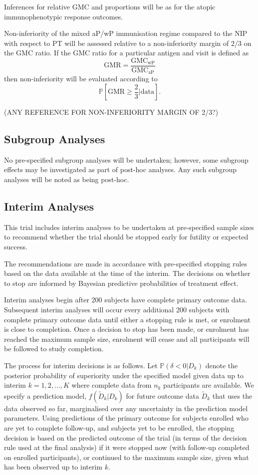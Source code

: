 \documentclass{bmcart}
\begin{document}
Inferences for relative GMC and proportions will be as for the atopic immunophenotypic response outcomes.

Non-inferiority of the mixed aP/wP immunisation regime compared to the NIP with respect to PT will be assessed relative to a non-inferiority margin of 2/3 on the GMC ratio.
If the GMC ratio for a particular antigen and visit is defined as
$$
\text{GMR} = \frac{\text{GMC}_\text{wP}}{\text{GMC}_\text{aP}}
$$ 
then non-inferiority will be evaluated according to
$$
\mathbb P\left[\text{GMR}\geq \frac{2}{3}\Big\vert \text{data}\right].
$$

(ANY REFERENCE FOR NON-INFERIORITY MARGIN OF 2/3?)

\subsection*{Subgroup Analyses}

No pre-specified subgroup analyses will be undertaken; however, some subgroup effects may be investigated as part of post-hoc analyses.
Any such subgroup analyses will be noted as being post-hoc.

\subsection*{Interim Analyses}

This trial includes interim analyses to be undertaken at pre-specified sample sizes to recommend whether the trial should be stopped early for futility or expected success.

The recommendations are made in accordance with pre-specified stopping rules based on the data available at the time of the interim.
The decisions on whether to stop are informed by Bayesian predictive probabilities of treatment effect.

Interim analyses begin after 200 subjects have complete primary outcome data.
Subsequent interim analyses will occur every additional 200 subjects with complete primary outcome data until either a stopping rule is met, or enrolment is close to completion.
Once a decision to stop has been made, or enrolment has reached the maximum sample size, enrolment will cease and all participants will be followed to study completion.

The process for interim decisions is as follows.
Let $\mathbb P(\delta < 0|D_k)$ denote the posterior probability of superiority under the specified model given data up to interim $k=1,2,...,K$ where complete data from $n_k$ participants are available.
We specify a prediction model, $f(\tilde D_k|D_k)$ for future outcome data $\tilde D_k$ that uses the data observed so far, marginalised over any uncertainty in the prediction model parameters.
Using predictions of the primary outcome for subjects enrolled who are yet to complete follow-up, and subjects yet to be enrolled, the stopping decision is based on the predicted outcome of the trial (in terms of the decision rule used at the final analysis) if it were stopped now (with follow-up completed on enrolled participants), or continued to the maximum sample size, given what has been observed up to interim $k$.
\end{document}
